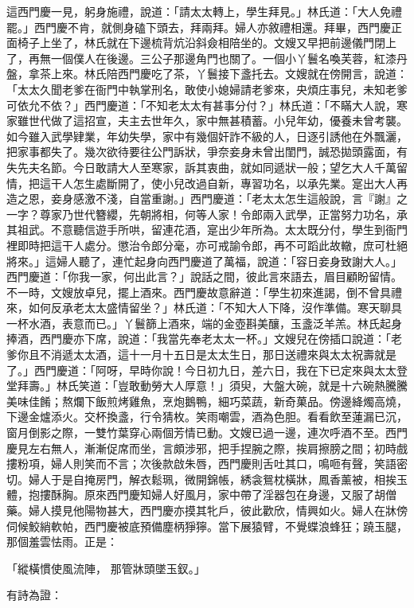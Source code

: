 這西門慶一見，躬身施禮，說道：「請太太轉上，學生拜見。」林氏道：「大人免禮罷。」西門慶不肯，就側身磕下頭去，拜兩拜。婦人亦敘禮相還。拜畢，西門慶正面椅子上坐了，林氏就在下邊梳背炕沿斜僉相陪坐的。文嫂又早把前邊儀門閉上了，再無一個僕人在後邊。三公子那邊角門也關了。一個小丫鬟名喚芙蓉，紅漆丹盤，拿茶上來。林氏陪西門慶吃了茶，丫鬟接下盞托去。文嫂就在傍開言，說道：「太太久聞老爹在衙門中執掌刑名，敢使小媳婦請老爹來，央煩庄事兒，未知老爹可依允不依？」西門慶道：「不知老太太有甚事分付？」林氏道：「不瞞大人說，寒家雖世代做了這招宣，夫主去世年久，家中無甚積蓄。小兒年幼，優養未曾考襲。如今雖入武學肄業，年幼失學，家中有幾個奸詐不級的人，日逐引誘他在外飄灑，把家事都失了。幾次欲待要往公門訴狀，爭奈妾身未曾出閨門，誠恐拋頭露面，有失先夫名節。今日敢請大人至寒家，訴其衷曲，就如同遞狀一般；望乞大人千萬留情，把這干人怎生處斷開了，使小兒改過自新，專習功名，以承先業。寔出大人再造之恩，妾身感激不淺，自當重謝。」西門慶道：「老太太怎生這般說，言『謝』之一字？尊家乃世代簪纓，先朝將相，何等人家！令郎兩入武學，正當努力功名，承其祖武。不意聽信遊手所哄，留連花酒，寔出少年所為。太太既分付，學生到衙門裡即時把這干人處分。懲治令郎分毫，亦可戒諭令郎，再不可蹈此故轍，庶可杜絕將來。」這婦人聽了，連忙起身向西門慶道了萬福，說道：「容日妾身致謝大人。」西門慶道：「你我一家，何出此言？」說話之間，彼此言來語去，眉目顧盼留情。不一時，文嫂放卓兒，擺上酒來。西門慶故意辭道：「學生初來進謁，倒不曾具禮來，如何反承老太太盛情留坐？」林氏道：「不知大人下降，沒作準備。寒天聊具一杯水酒，表意而已。」丫鬟篩上酒來，端的金壺斟美釀，玉盞泛羊羔。林氏起身捧酒，西門慶亦下席，說道：「我當先奉老太太一杯。」文嫂兒在傍插口說道：「老爹你且不消遞太太酒，這十一月十五日是太太生日，那日送禮來與太太祝壽就是了。」西門慶道：「阿呀，早時你說！今日初九日，差六日，我在下已定來與太太登堂拜壽。」林氏笑道：「豈敢動勞大人厚意！」須臾，大盤大碗，就是十六碗熱騰騰美味佳餚；熬爛下飯煎烤雞魚，烹炮鵝鴨，細巧菜蔬，新奇菓品。傍邊絳燭高燒，下邊金爐添火。交杯換盞，行令猜枚。笑雨嘲雲，酒為色胆。看看飲至蓮漏已沉，窗月倒影之際，一雙竹葉穿心兩個芳情已動。文嫂已過一邊，連次呼酒不至。西門慶見左右無人，漸漸促席而坐，言頗涉邪，把手捏腕之際，挨肩擦膀之間；初時戲摟粉項，婦人則笑而不言；次後款啟朱唇，西門慶則舌吐其口，鳴咂有聲，笑語密切。婦人于是自掩房門，解衣鬆珮，微開錦帳，綉衾鴛枕橫牀，鳳香薰被，相挨玉體，抱摟酥胸。原來西門慶知婦人好風月，家中帶了淫器包在身邊，又服了胡僧藥。婦人摸見他陽物甚大，西門慶亦摸其牝戶，彼此歡欣，情興如火。婦人在牀傍伺候鮫綃軟帕，西門慶被底預備塵柄猙獰。當下展猿臂，不覺蝶浪蜂狂；蹺玉腿，那個羞雲怯雨。正是：

「縱橫慣使風流陣，  那管牀頭墜玉釵。」

有詩為證：

